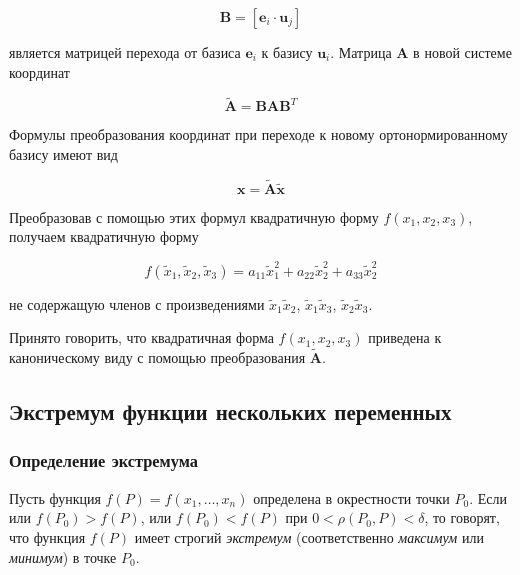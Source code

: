     	\begin{equation}
    		\mathbf{B} = \left[ \mathbf{e}_{i} \cdot \mathbf{u}_{j} \right]
    	\end{equation}

        является матрицей перехода от базиса $\mathbf{e}_{i}$ к базису $\mathbf{u}_{i}$. Матрица $\mathbf{A}$ в новой системе координат

        \begin{equation}
            \tilde{\mathbf{A}} = \mathbf{B A B}^{T}
        \end{equation}

        Формулы преобразования координат при переходе к новому ортонормированному базису имеют вид

        \begin{equation}
            \mathbf{x} = \tilde{\mathbf{A}} \tilde{\mathbf{x}}
        \end{equation}

        Преобразовав с помощью этих формул квадратичную форму $f \left( x_{1}, x_{2}, x_{3} \right)$, получаем квадратичную форму

        \begin{equation}
            f \left( \tilde{x}_{1}, \tilde{x}_{2}, \tilde{x}_{3} \right) = a_{11} \tilde{x}^{2}_{1} + a_{22} \tilde{x}^{2}_{2} + a_{33} \tilde{x}^{2}_{2}
        \end{equation}

        не содержащую членов с произведениями $\tilde{x}_{1} \tilde{x}_{2}$, $\tilde{x}_{1} \tilde{x}_{3}$, $\tilde{x}_{2} \tilde{x}_{3}$.

        Принято говорить, что квадратичная форма $f \left( x_{1}, x_{2}, x_{3} \right)$ приведена к каноническому виду с помощью преобразования $\tilde{\mathbf{A}}$.

		\newpage

    \subsection*{Экстремум функции нескольких переменных}

	    \subsubsection*{Определение экстремума}

		    Пусть функция $f \left( P \right) = f \left( x_{1}, \ldots, x_{n} \right)$ определена в окрестности точки $P_{0}$. Если или $f \left( P_{0} \right) > f \left( P \right)$, или $f \left( P_{0} \right) < f \left( P \right)$ при $0 < \rho \left( P_{0}, P \right) < \delta$, то говорят, что функция $f \left( P \right)$ имеет строгий \textit{экстремум} (соответственно \textit{максимум} или \textit{минимум}) в точке $P_{0}$.\\

